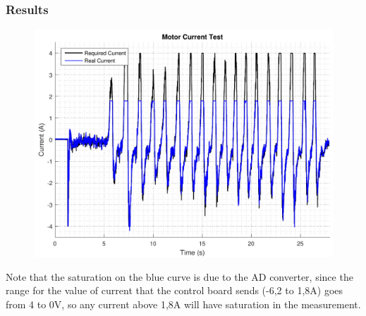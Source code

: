 \subsubsection{Results}
\begin{figure}[H]
	\includegraphics[scale=.65]{figures/motorCurrentTest}
	\centering
	\caption{}
\end{figure} \label{motorCurrentTest}

Note that the saturation on the blue curve is due to the AD converter, since the range for the value of current that the control board sends (-6,2 to 1,8A) goes from 4 to 0V, so any current above 1,8A will have saturation in the measurement.